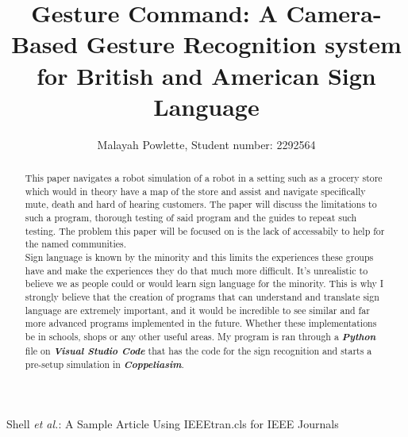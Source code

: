 \documentclass[lettersize,journal]{IEEEtran}
\begin{document}
\title{Gesture Command: A Camera-Based Gesture Recognition system for British and American Sign Language}

\author{Malayah Powlette, Student number: 2292564}

%
{Shell \MakeLowercase{\textit{et al.}}: A Sample Article Using IEEEtran.cls for IEEE Journals}

\maketitle

\begin{abstract}
This paper navigates a robot simulation of a robot in a setting such as a grocery store which would in theory have a map of the store and assist and navigate  specifically mute, death and hard of hearing customers. The paper will discuss the limitations to such a program, thorough testing of said program and the guides to repeat such testing.
The problem this paper will be focused on is the lack of accessabily to help for the named communities. 
\\
Sign language is known by the minority and this limits the experiences these groups have and make the experiences they do that much more difficult. It's unrealistic to believe we as people could or would learn sign language for the minority. This is why I strongly believe that the creation of programs that can understand and translate sign language are extremely important, and it would be incredible to see similar and far more advanced programs implemented in the future. Whether these implementations be in schools, shops or any other useful areas. My program is ran through a \textbf{\textit{Python}} file on \textbf{\textit{Visual Studio Code}} that has the code for the sign recognition and starts a pre-setup simulation in \textbf{\textit{Coppeliasim}}. 
\end{abstract}
\end{document}
